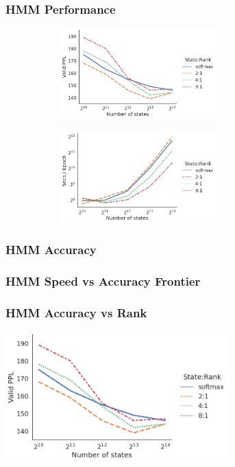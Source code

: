 \documentclass{beamer}
\begin{document}
\begin{frame}
\frametitle{HMM Performance}
\begin{center}
\begin{figure}[H]
\begin{subfigure}[t]{0.40\textwidth}
\includegraphics[height=3.5cm,trim={0 0 5cm 0}, clip]{imgs/hmm/lhmm-states-features-dropout.png}
\end{subfigure}
\hspace{1.5em}
\begin{subfigure}[t]{0.50\textwidth}
\includegraphics[height=3.5cm]{imgs/hmm/lhmm-states-features-speed.png}
\end{subfigure}
\end{figure}
\end{center}
\end{frame}

\begin{frame}
\frametitle{HMM Accuracy}
\end{frame}

\begin{frame}
\frametitle{HMM Speed vs Accuracy Frontier}
\end{frame}

\begin{frame}
\frametitle{HMM Accuracy vs Rank}
\begin{center}
\includegraphics[height=5cm]{imgs/hmm/lhmm-states-features-dropout.png}
\end{center}
\end{frame}
\end{document}
